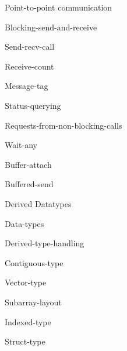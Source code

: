 \documentclass[11pt,headernav]{beamer}
\begin{document}
 {Point-to-point communication}

\begin{frame}[containsverbatim]{Blocking-send-and-receive}
  
\end{frame}
\begin{frame}[containsverbatim]{Send-recv-call}
  
\end{frame}
\begin{frame}[containsverbatim]{Receive-count}
  
\end{frame}
\begin{frame}[containsverbatim]{Message-tag}
  
\end{frame}
\begin{frame}[containsverbatim]{Status-querying}
  
\end{frame}

\begin{frame}[containsverbatim]{Requests-from-non-blocking-calls}
  
\end{frame}
\begin{frame}[containsverbatim]{Wait-any}
  
\end{frame}

\begin{frame}[containsverbatim]{Buffer-attach}
  
\end{frame}
\begin{frame}[containsverbatim]{Buffered-send}
  
\end{frame}

 {Derived Datatypes}

\begin{frame}[containsverbatim]{Data-types}
  
\end{frame}
\begin{frame}[containsverbatim]{Derived-type-handling}
  
\end{frame}
\begin{frame}[containsverbatim]{Contiguous-type}
  
\end{frame}
\begin{frame}[containsverbatim]{Vector-type}
  
\end{frame}
\begin{frame}[containsverbatim]{Subarray-layout}
  
\end{frame}
\begin{frame}[containsverbatim]{Indexed-type}
  
\end{frame}
\begin{frame}[containsverbatim]{Struct-type}
  
\end{frame}
\end{document}
